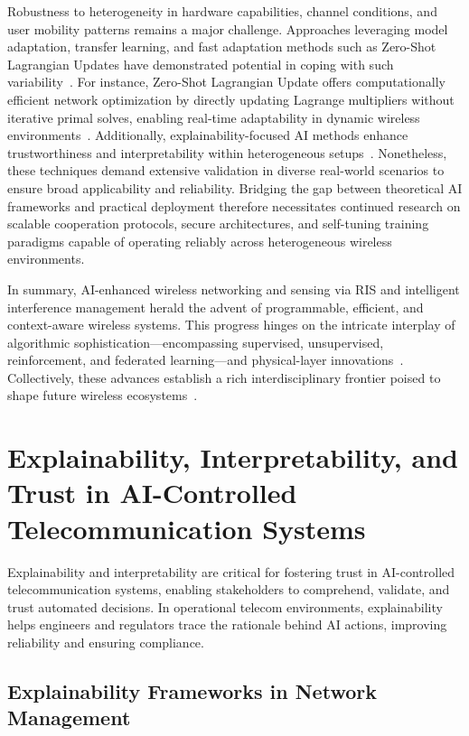\documentclass[sigconf]{acmart}
\begin{document}
Robustness to heterogeneity in hardware capabilities, channel conditions, and user mobility patterns remains a major challenge. Approaches leveraging model adaptation, transfer learning, and fast adaptation methods such as Zero-Shot Lagrangian Updates have demonstrated potential in coping with such variability~\cite{ref44,ref45}. For instance, Zero-Shot Lagrangian Update offers computationally efficient network optimization by directly updating Lagrange multipliers without iterative primal solves, enabling real-time adaptability in dynamic wireless environments~\cite{ref44}. Additionally, explainability-focused AI methods enhance trustworthiness and interpretability within heterogeneous setups~\cite{ref45}. Nonetheless, these techniques demand extensive validation in diverse real-world scenarios to ensure broad applicability and reliability. Bridging the gap between theoretical AI frameworks and practical deployment therefore necessitates continued research on scalable cooperation protocols, secure architectures, and self-tuning training paradigms capable of operating reliably across heterogeneous wireless environments.

\bigskip

In summary, AI-enhanced wireless networking and sensing via RIS and intelligent interference management herald the advent of programmable, efficient, and context-aware wireless systems. This progress hinges on the intricate interplay of algorithmic sophistication—encompassing supervised, unsupervised, reinforcement, and federated learning—and physical-layer innovations~\cite{ref49}. Collectively, these advances establish a rich interdisciplinary frontier poised to shape future wireless ecosystems~\cite{ref41,ref42,ref43,ref44,ref45,ref48,ref49}.

\section{Explainability, Interpretability, and Trust in AI-Controlled Telecommunication Systems}

Explainability and interpretability are critical for fostering trust in AI-controlled telecommunication systems, enabling stakeholders to comprehend, validate, and trust automated decisions. In operational telecom environments, explainability helps engineers and regulators trace the rationale behind AI actions, improving reliability and ensuring compliance.

\subsection{Explainability Frameworks in Network Management}
\end{document}
